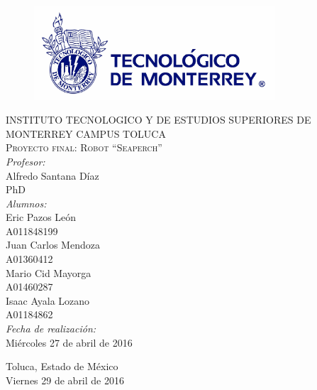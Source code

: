 \begin{titlepage}
\begin{center}
\begin{figure}[!htbp]
\centering
\includegraphics[width=90mm]{./img/logo_itesm.jpg}
\end{figure}


\textsc{ INSTITUTO TECNOLOGICO Y DE ESTUDIOS SUPERIORES DE MONTERREY
CAMPUS TOLUCA}\\[1.5cm]

\textsc{ Proyecto final: Robot ``Seaperch''}\\[0.5cm]


\emph{Profesor:}\\
 Alfredo Santana D\'iaz\\
 PhD\\
 \medskip
\emph{Alumnos:} \\
Eric Pazos Le\'on\\A011848199\\
Juan Carlos Mendoza\\A01360412\\
Mario Cid Mayorga\\A01460287\\
Isaac Ayala Lozano\\A01184862\\
 \medskip
\emph{Fecha de realizaci\'on:}\\
Mi\'ercoles 27 de abril de 2016\\
\vfill


{\large
Toluca, Estado de M\'exico\\
Viernes 29 de abril de 2016
}

\end{center}
\end{titlepage}
